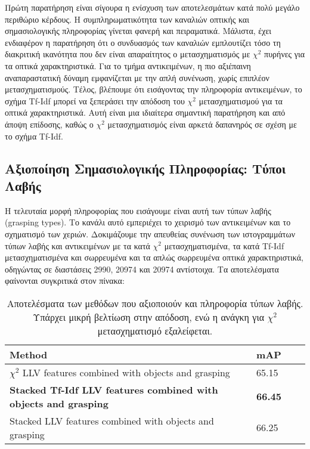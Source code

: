 \documentclass[11pt,a4paper,english,greek,twoside]{../Thesis}
\begin{document}
\par Πρώτη παρατήρηση είναι σίγουρα η ενίσχυση των αποτελεσμάτων κατά πολύ μεγάλο περιθώριο κέρδους. Η συμπληρωματικότητα των καναλιών οπτικής και σημασιολογικής πληροφορίας γίνεται φανερή και πειραματικά. Μάλιστα, έχει ενδιαφέρον η παρατήρηση ότι ο συνδυασμός των καναλιών εμπλουτίζει τόσο τη διακριτική ικανότητα που δεν είναι απαραίτητος ο μετασχηματισμός με $\chi^2$ πυρήνες για τα οπτικά χαρακτηριστικά. Για το τμήμα αντικειμένων, η πιο αξιέπαινη αναπαραστατική δύναμη εμφανίζεται με την απλή συνένωση, χωρίς επιπλέον μετασχηματισμούς. Τέλος, βλέπουμε ότι εισάγοντας την πληροφορία αντικειμένων, το σχήμα Tf-Idf μπορεί να ξεπεράσει την απόδοση του $\chi^2$ μετασχηματισμού για τα οπτικά χαρακτηριστικά. Αυτή είναι μια ιδιαίτερα σημαντική παρατήρηση και από άποψη επίδοσης, καθώς ο $\chi^2$ μετασχηματισμός είναι αρκετά δαπανηρός σε σχέση με το σχήμα Tf-Idf.

\subsection{Αξιοποίηση Σημασιολογικής Πληροφορίας: Τύποι Λαβής}
Η τελευταία μορφή πληροφορίας που εισάγουμε είναι αυτή των τύπων λαβής (grasping types). Το κανάλι αυτό εμπεριέχει το χειρισμό των αντικειμένων και το σχηματισμό των χεριών. Δοκιμάζουμε την απευθείας συνένωση των ιστογραμμάτων τύπων λαβής και αντικειμένων με τα κατά $\chi^2$ μετασχηματισμένα, τα κατά Tf-Idf μετασχηματισμένα και σωρρευμένα και τα απλώς σωρρευμένα οπτικά χαρακτηριστικά, οδηγώντας σε διαστάσεις 2990, 20974 και 20974 αντίστοιχα. Τα αποτελέσματα φαίνονται συγκριτικά στον πίνακα:

\begin{table}[H]
	\centering
    \begin{tabular}{| l | l | l | l |}
    \hline
    \textbf{Method} & \textbf{mAP} \\ \hline
    $\chi^2$ LLV features combined with objects and grasping & 65.15 \\ \hline
    \textbf{Stacked Tf-Idf LLV features combined with objects and grasping} & \textbf{66.45} \\ \hline
    Stacked LLV features combined with objects and grasping & 66.25 \\
    \hline
    \end{tabular}
	\label{tab:GraspResults}
	\caption{Αποτελέσματα των μεθόδων που αξιοποιούν και πληροφορία τύπων λαβής. Υπάρχει μικρή βελτίωση στην απόδοση, ενώ η ανάγκη για $\chi^2$ μετασχηματισμό εξαλείφεται.}
\end{table}
\end{document}

